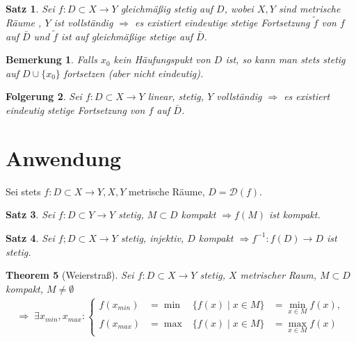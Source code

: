 \documentclass[ngerman,a4paper]{report}
\theoremstyle{break}
\newtheorem{theorem}{Theorem}[section]
\newtheorem{satz}[theorem]{Satz}
\newtheorem*{*remark}{Bemerkung} %
\newtheorem{conclusion}[theorem]{Folgerung}
\begin{document}
\begin{satz}
    Sei $f: D \subset X \to Y$ gleichmäßig stetig auf $D$, wobei $X,Y$  sind metrische Räume , $Y$ ist vollständig $\Rightarrow$ es existiert eindeutige stetige Fortsetzung $\tilde{f}$ von $f$ auf $\bar{D}$ und $\tilde{f}$ ist auf gleichmäßige stetige auf $\bar{D}$.
\end{satz}

\begin{*remark}
    Falls $x_0$ kein Häufungspukt von $D$ ist, so kann man stets stetig auf $D\cup \{x_0\}$ fortsetzen (aber nicht eindeutig).
\end{*remark}

\addtocounter{theorem}{6}

\begin{conclusion}
    Sei $f: D \subset X \to Y$ linear, stetig, $Y$ vollständig $\Rightarrow$ es existiert eindeutig stetige Fortsetzung von $f$ auf $\bar{D}$.
\end{conclusion}

\section{Anwendung}

Sei stets $f: D \subset X \to Y,X,Y$ metrische Räume, $D = \mathcal{D}(f)$.

\begin{satz}
    Sei $f: D \subset Y \to Y$ stetig, $M \subset D$ kompakt $\Rightarrow f(M)$ ist kompakt.
\end{satz}

\begin{satz}
    Sei $f; D \subset X \to Y$ stetig, injektiv, $D$ kompakt $\Rightarrow f^{-1}:f(D) \to D$ ist stetig.
\end{satz}

\begin{theorem}[Weierstraß]\label{weierstrass}
    Sei $f: D \subset X \to Y$ stetig, $X$ metrischer Raum, $M \subset D$ kompakt, $M \neq \emptyset$
    \begin{align}
	    \Rightarrow \; \exists x_{min}, x_{max} : \left\{
       \begin{alignedat}{3}
	        f(x_{min}) &= \min&\{f(x)\mid x \in M\} &= \min_{x\in M} f(x),\\
		f(x_{max}) &= \max&\{f(x)\mid x \in M\} &= \max_{x\in M} f(x)
	\end{alignedat}\right.
    \end{align}
\end{theorem}
\end{document}
